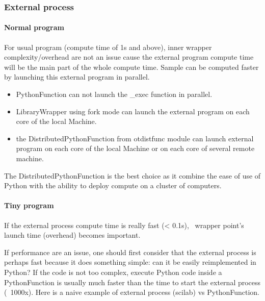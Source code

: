 \subsubsection{External process}

\paragraph{Normal program}

For usual program (compute time of 1s and above), inner wrapper complexity/overhead are not an issue cause the external program compute time will be the main part of the whole compute time. Sample can be computed faster by launching this external program in parallel.

\begin{itemize}
\item PythonFunction can not launch the \_exec function in parallel.
\item LibraryWrapper using fork mode can launch the external program on each core of the local Machine.
\item the DistributedPythonFunction from otdistfunc module can launch external program on each core of the local Machine or on each core of several remote machine.
\end{itemize}

The DistributedPythonFunction is the best choice as it combine the ease of use of Python with the ability to deploy compute on a cluster of computers.



\paragraph{Tiny program}

If the external process compute time is really fast (< 0.1s), \OT\ wrapper point's launch time (overhead) becomes important.

If performance are an issue, one should first consider that the external process is perhaps fast because it does something simple: can it be easily reimplemented in Python? If the code is not too complex, execute Python code inside a PythonFunction is usually much faster than the time to start the external process (~1000x). Here is a naive example of external process (scilab) vs PythonFunction.


